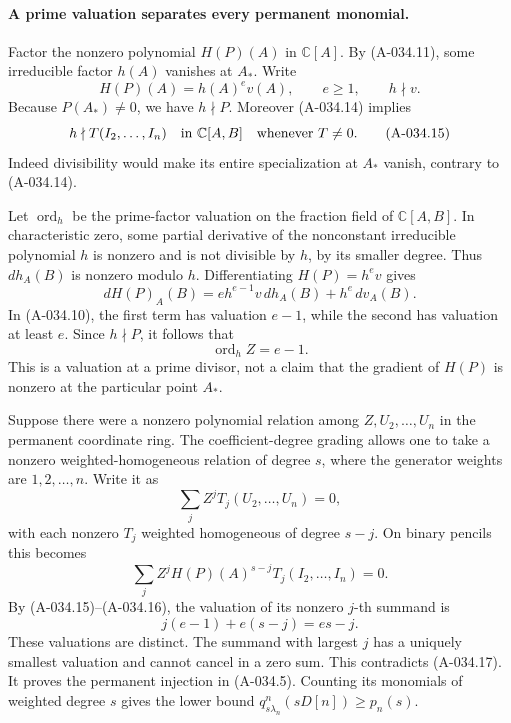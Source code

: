 \paragraph{A prime valuation separates every permanent monomial.}
Factor the nonzero polynomial \(H(P)(A)\) in
\(\mathbb C[A]\). By (A-034.11), some irreducible factor
\(h(A)\) vanishes at \(A_*\). Write
\[
                 H(P)(A)=h(A)^e v(A),\qquad
                 e\geq1,\qquad h\nmid v.
\]
Because \(P(A_*)\ne0\), we have \(h\nmid P\).
Moreover (A-034.14) implies
\[
       h\nmid T(I_2,\ldots,I_n)\quad\hbox{in }\mathbb C[A,B]
                         \quad\hbox{whenever }T\ne0.           \tag{A-034.15}
\]
Indeed divisibility would make its entire specialization
at \(A_*\) vanish, contrary to (A-034.14).

Let \(\operatorname{ord}_h\) be the prime-factor valuation
on the fraction field of \(\mathbb C[A,B]\).
In characteristic zero, some partial derivative of the
nonconstant irreducible polynomial \(h\) is nonzero and
is not divisible by \(h\), by its smaller degree.
Thus \(d h_A(B)\) is nonzero modulo \(h\).
Differentiating \(H(P)=h^e v\) gives
\[
 dH(P)_A(B)=e h^{e-1}v\,dh_A(B)+h^e\,dv_A(B).
\]
In (A-034.10), the first term has valuation \(e-1\),
while the second has valuation at least \(e\).
Since \(h\nmid P\), it follows that
\[
                         \operatorname{ord}_h Z=e-1.          \tag{A-034.16}
\]
This is a valuation at a prime divisor, not a claim that
the gradient of \(H(P)\) is nonzero at the particular
point \(A_*\).

Suppose there were a nonzero polynomial relation among
\(Z,U_2,\ldots,U_n\) in the permanent coordinate ring.
The coefficient-degree grading allows one to take a
nonzero weighted-homogeneous relation of degree \(s\),
where the generator weights are \(1,2,\ldots,n\).
Write it as
\[
                    \sum_j Z^j T_j(U_2,\ldots,U_n)=0,
\]
with each nonzero \(T_j\) weighted homogeneous of
degree \(s-j\). On binary pencils this becomes
\[
             \sum_j Z^j H(P)(A)^{s-j}
                                T_j(I_2,\ldots,I_n)=0.         \tag{A-034.17}
\]
By (A-034.15)--(A-034.16), the valuation of its
nonzero \(j\)-th summand is
\[
                  j(e-1)+e(s-j)=es-j.
\]
These valuations are distinct. The summand with largest
\(j\) has a uniquely smallest valuation and cannot cancel
in a zero sum. This contradicts (A-034.17).
It proves the permanent injection in (A-034.5).
Counting its monomials of weighted degree \(s\) gives
the lower bound \(q^n_{s\lambda_n}(sD[n])\geq p_n(s)\).

